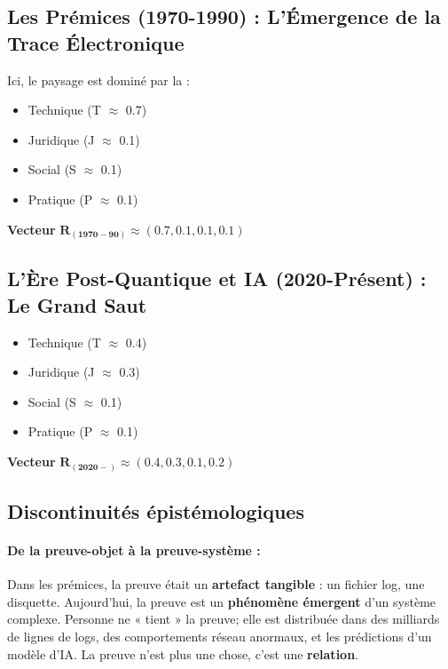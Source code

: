 \documentclass[12pt]{article}
\begin{document}
\subsection{Les Prémices (1970-1990) : L'Émergence de la Trace Électronique}

Ici, le paysage est dominé par la :
\begin{itemize}
\item Technique (T $\approx$ 0.7)
\item Juridique (J $\approx$ 0.1) 
\item Social (S $\approx$ 0.1)
\item Pratique (P $\approx$ 0.1)
\end{itemize}

\textbf{Vecteur } $\mathbf{R_{(1970-90)}} \approx (0.7, 0.1, 0.1, 0.1)$

\subsection{L'Ère Post-Quantique et IA (2020-Présent) : Le Grand Saut}

\begin{itemize}
\item Technique (T $\approx$ 0.4)
\item Juridique (J $\approx$ 0.3)
\item Social (S $\approx$ 0.1)
\item Pratique (P $\approx$ 0.1)
\end{itemize}

\textbf{Vecteur } $\mathbf{R_{(2020-)}} \approx (0.4, 0.3, 0.1, 0.2)$

\subsection{Discontinuités épistémologiques}

\paragraph{De la preuve-objet à la preuve-système :}
Dans les prémices, la preuve était un \textbf{artefact tangible} : un fichier log, une disquette. Aujourd'hui, la preuve est un \textbf{phénomène émergent} d'un système complexe. Personne ne « tient » la preuve; elle est distribuée dans des milliards de lignes de logs, des comportements réseau anormaux, et les prédictions d'un modèle d'IA. La preuve n'est plus une chose, c'est une \textbf{relation}.
\end{document}
